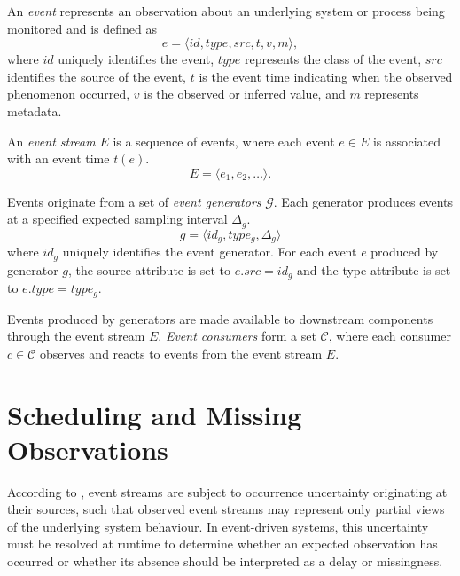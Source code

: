An \emph{event} represents an observation about an underlying system or process being monitored and is defined as
\begin{equation}
e = \langle id, type, src, t, v, m \rangle ,
\end{equation}
\noindent
where $id$ uniquely identifies the event, $type$ represents the class of the event, $src$ identifies the source of the event, $t$ is the event time indicating when the observed phenomenon occurred, $v$ is the observed or inferred value, and $m$ represents metadata.


An \emph{event stream} $E$ is a sequence of events, where each event $e \in E$ is associated with an event time $t(e)$.
\begin{equation}
E = \langle e_1, e_2, \dots \rangle .
\end{equation}

Events originate from a set of \emph{event generators} $\mathcal{G}$. Each generator produces events at a specified expected sampling interval $\Delta_g$.
\begin{equation}
g = \langle id_g, type_g, \Delta_g \rangle
\end{equation}
\noindent
where $id_g$ uniquely identifies the event generator. For each event $e$ produced by generator $g$, the source attribute is set to $e.src = id_g$ and the type attribute is set to $e.type = type_g$.

Events produced by generators are made available to downstream components through the event stream $E$. \emph{Event consumers} form a set $\mathcal{C}$, where each consumer $c \in \mathcal{C}$ observes and reacts to events from the event stream $E$.



\section{Scheduling and Missing Observations}
\label{sec:scheduling-missing} %
According to \citet{wasserkrug2006taxonomy}, event streams are subject to occurrence uncertainty originating at their sources, such that observed event streams may represent only partial views of the underlying system behaviour. In event-driven systems, this uncertainty must be resolved at runtime to determine whether an expected observation has occurred or whether its absence should be interpreted as a delay or missingness.

